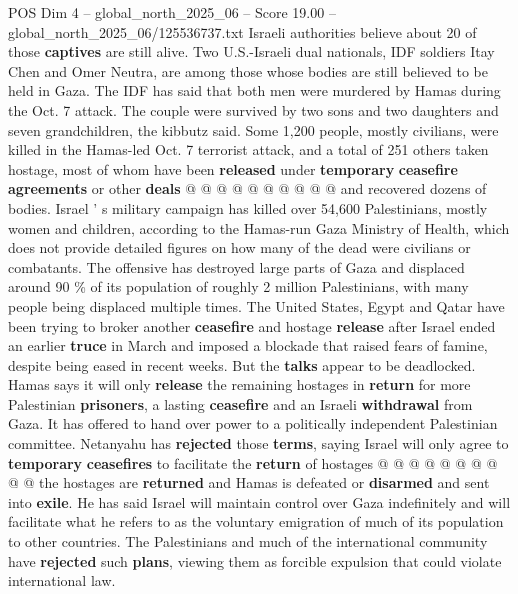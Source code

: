 \begin{textsample}{POS Dim 4 – global\_north\_2025\_06 – Score 19.00 – global\_north\_2025\_06/125536737.txt}
Israeli authorities believe about 20 of those \textbf{captives} are still alive.
Two U.S.-Israeli dual nationals, IDF soldiers Itay Chen and Omer Neutra, are among those whose bodies are still believed to be held in Gaza.
The IDF has said that both men were murdered by Hamas during the Oct. 7 attack.
The couple were survived by two sons and two daughters and seven grandchildren, the kibbutz said.
Some 1,200 people, mostly civilians, were killed in the Hamas-led Oct. 7 terrorist attack, and a total of 251 others taken hostage, most of whom have been \textbf{released} under \textbf{temporary} \textbf{ceasefire} \textbf{agreements} or other \textbf{deals} @ @ @ @ @ @ @ @ @ @ and recovered dozens of bodies.
Israel ' s military campaign has killed over 54,600 Palestinians, mostly women and children, according to the Hamas-run Gaza Ministry of Health, which does not provide detailed figures on how many of the dead were civilians or combatants.
The offensive has destroyed large parts of Gaza and displaced around 90 \% of its population of roughly 2 million Palestinians, with many people being displaced multiple times.
The United States, Egypt and Qatar have been trying to broker another \textbf{ceasefire} and hostage \textbf{release} after Israel ended an earlier \textbf{truce} in March and imposed a blockade that raised fears of famine, despite being eased in recent weeks.
But the \textbf{talks} appear to be deadlocked.
Hamas says it will only \textbf{release} the remaining hostages in \textbf{return} for more Palestinian \textbf{prisoners}, a lasting \textbf{ceasefire} and an Israeli \textbf{withdrawal} from Gaza.
It has offered to hand over power to a politically independent Palestinian committee.
Netanyahu has \textbf{rejected} those \textbf{terms}, saying Israel will only agree to \textbf{temporary} \textbf{ceasefires} to facilitate the \textbf{return} of hostages @ @ @ @ @ @ @ @ @ @ the hostages are \textbf{returned} and Hamas is defeated or \textbf{disarmed} and sent into \textbf{exile}.
He has said Israel will maintain control over Gaza indefinitely and will facilitate what he refers to as the voluntary emigration of much of its population to other countries.
The Palestinians and much of the international community have \textbf{rejected} such \textbf{plans}, viewing them as forcible expulsion that could violate international law.

\end{textsample}
